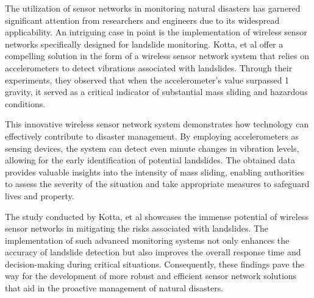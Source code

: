 \documentclass[conference]{IEEEtran}
\begin{document}
The utilization of sensor networks in monitoring natural disasters has garnered significant attention from 
researchers and engineers due to its widespread applicability. An intriguing case in point is the implementation 
of wireless sensor networks specifically designed for landslide monitoring. Kotta, et al \cite{je1} offer a 
compelling solution in the form of a wireless sensor network system that relies on accelerometers to detect 
vibrations associated with landslides. Through their experiments, they observed that when the accelerometer's 
value surpassed 1 gravity, it served as a critical indicator of substantial mass sliding and hazardous 
conditions.\par

This innovative wireless sensor network system demonstrates how technology can effectively contribute to 
disaster management. By employing accelerometers as sensing devices, the system can detect even minute changes 
in vibration levels, allowing for the early identification of potential landslides. The obtained data provides 
valuable insights into the intensity of mass sliding, enabling authorities to assess the severity of the 
situation and take appropriate measures to safeguard lives and property.\par

The study conducted by Kotta, et al \cite{je1} showcases the immense potential of wireless sensor networks 
in mitigating the risks associated with landslides. The implementation of such advanced monitoring systems 
not only enhances the accuracy of landslide detection but also improves the overall response time and 
decision-making during critical situations. Consequently, these findings pave the way for the development 
of more robust and efficient sensor network solutions that aid in the proactive management of natural 
disasters.\par
\end{document}
